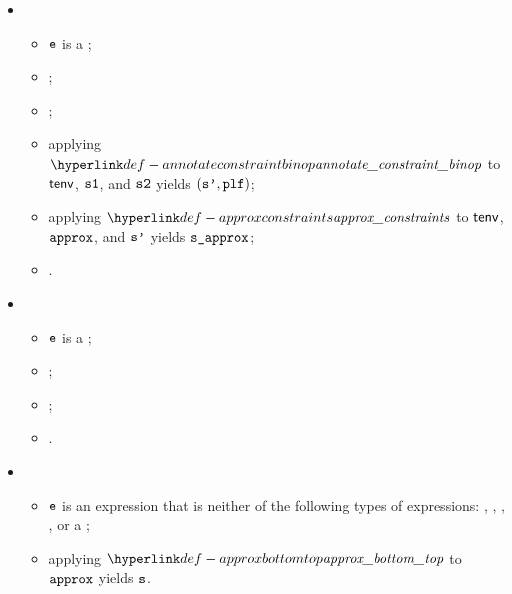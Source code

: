\begin{itemize}
  \item {}
  \begin{itemize}
    \item $\ve$ is a \binopexpression{$\op$}{$\veone$}{$\vetwo$};
    \item \Proseapproxexpr{$\tenv$}{$\vapprox$}{$\veone$}{$\vsone$}\ProseTerminateAs{\Z};
    \item \Proseapproxexpr{$\tenv$}{$\vapprox$}{$\vetwo$}{$\vstwo$}\ProseTerminateAs{\Z};
    \item applying $\annotateconstraintbinop$ to $\tenv$, $\vsone$, and $\vstwo$ yields $(\vsp, \plf)$;
    \item applying $\approxconstraints$ to $\tenv$, $\vapprox$, and $\vsp$ yields $\vsapprox$;
    \item {}.
  \end{itemize}

  \item {}
  \begin{itemize}
    \item $\ve$ is a ;
    \item \Proseapproxexpr{$\tenv$}{$\vapprox$}{$\vetwo$}{$\vstwo$}\ProseTerminateAs{\Z};
    \item \Proseapproxexpr{$\tenv$}{$\vapprox$}{$\vethree$}{$\vsthree$}\ProseTerminateAs{\Z};
    \item {}.
  \end{itemize}

  \item {}
  \begin{itemize}
    \item $\ve$ is an expression that is neither of the following types of expressions:
          \literalexpressionterm, \variableexpressionterm, \unopexpressionterm, \binopexpressionterm,
          or a \condexpressionterm;
    \item applying $\approxbottomtop$ to $\vapprox$ yields $\vs$.
  \end{itemize}
\end{itemize}

\FormallyParagraph
\begin{mathpar}
\end{mathpar}

